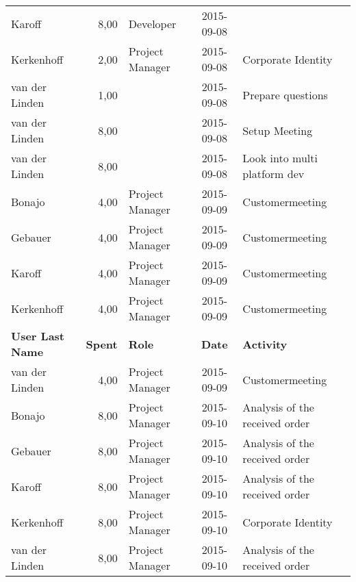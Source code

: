 \begin{longtable}{ l r p{2cm} c p{4cm}}
		Karoff                  & 8,00           & Developer       & 2015-09-08    &                                                 \\
		Kerkenhoff              & 2,00           & Project Manager & 2015-09-08    & Corporate Identity                              \\
		van der Linden          & 1,00           &                 & 2015-09-08    & Prepare questions                               \\
		van der Linden          & 8,00           &                 & 2015-09-08    & Setup Meeting                                   \\
		van der Linden          & 8,00           &                 & 2015-09-08    & Look into multi platform dev                    \\
		Bonajo                  & 4,00           & Project Manager & 2015-09-09    & Customermeeting                                 \\
		Gebauer                 & 4,00           & Project Manager & 2015-09-09    & Customermeeting                                 \\
		Karoff                  & 4,00           & Project Manager & 2015-09-09    & Customermeeting                                 \\
		Kerkenhoff              & 4,00           & Project Manager & 2015-09-09    & Customermeeting                                 \\
		\textbf{User Last Name} & \textbf{Spent} & \textbf{Role} & \textbf{Date} & \textbf{Activity} \\
		\hline
		van der Linden          & 4,00           & Project Manager & 2015-09-09    & Customermeeting                                 \\
		Bonajo                  & 8,00           & Project Manager & 2015-09-10    & Analysis of the received order                  \\
		Gebauer                 & 8,00           & Project Manager & 2015-09-10    & Analysis of the received order                  \\
		Karoff                  & 8,00           & Project Manager & 2015-09-10    & Analysis of the received order                  \\
		Kerkenhoff              & 8,00           & Project Manager & 2015-09-10    & Corporate Identity                              \\
		van der Linden          & 8,00           & Project Manager & 2015-09-10    & Analysis of the received order                  \\

\end{longtable}

